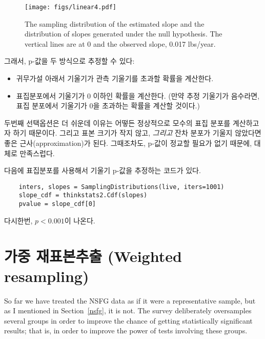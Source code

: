 
\begin{figure}
\centerline{\texttt{[image: figs/linear4.pdf]}}
\caption{The sampling distribution of the estimated
slope and the distribution of slopes
generated under the null hypothesis.  The vertical lines are at 0
and the observed slope, 0.017 lbs/year.}
\label{linear4}
\end{figure}

그래서, p-값을 두 방식으로 추정할 수 있다:

\begin{itemize}

\item 귀무가설 아래서 기울기가 관측 기울기를 초과할 확률을 계산한다.

\item 표집분포에서 기울기가 0 이하인 확률을 계산한다. (만약 추정 기울기가 음수라면, 표집 분포에서 기울기가 0을 초과하는 확률을 계산할 것이다.)

\end{itemize}

두번째 선택옵션은 더 쉬운데 이유는 어떻든 정상적으로 모수의 표집 분포를 계산하고자 하기 때문이다. 그리고 표본 크기가 작지 않고, {\em 그리고} 잔차 분포가 기울지 않았다면 좋은 근사(approximation)가 된다. 그때조차도, p-값이 정교할 필요가 없기 때문에, 대체로 만족스럽다.


다음에 표집분포를 사용해서 기울기 p-값을 추정하는 코드가 있다.

\begin{verbatim}
    inters, slopes = SamplingDistributions(live, iters=1001)
    slope_cdf = thinkstats2.Cdf(slopes)
    pvalue = slope_cdf[0]
\end{verbatim}

다시한번, $p < 0.001$이 나온다.  


\section{가중 재표본추출 (Weighted resampling)}
\label{weighted}

So far we have treated the NSFG data as if it were a representative
sample, but as I mentioned in Section~\ref{nsfg}, it is not.  The
survey deliberately oversamples several groups in order to
improve the chance of getting statistically significant results; that
is, in order to improve the power of tests involving these groups.
   

